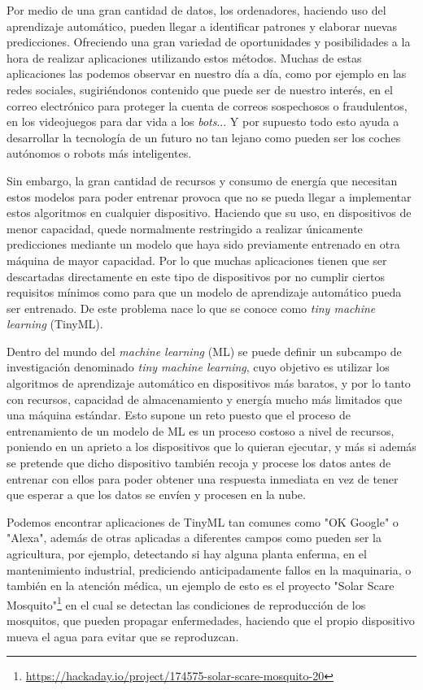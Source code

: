 \documentclass[a4paper, 12pt]{book}
\begin{document}
Por medio de una gran cantidad de datos, los ordenadores, haciendo uso del aprendizaje automático, pueden llegar a identificar patrones y elaborar nuevas predicciones. Ofreciendo una gran variedad de oportunidades y posibilidades a la hora de realizar aplicaciones utilizando estos métodos. Muchas de estas aplicaciones las podemos observar en nuestro día a día, como por ejemplo en las redes sociales, sugiriéndonos contenido que puede ser de nuestro interés, en el correo electrónico para proteger la cuenta de correos sospechosos o fraudulentos, en los videojuegos para dar vida a los \textit{bots}... Y por supuesto todo esto ayuda a desarrollar la tecnología de un futuro no tan lejano como pueden ser los coches autónomos o robots más inteligentes.

Sin embargo, la gran cantidad de recursos y consumo de energía que necesitan estos modelos para poder entrenar provoca que no se pueda llegar a implementar estos algoritmos en cualquier dispositivo. Haciendo que su uso, en dispositivos de menor capacidad, quede normalmente restringido a realizar únicamente predicciones mediante un modelo que haya sido previamente entrenado en otra máquina de mayor capacidad. Por lo que muchas aplicaciones tienen que ser descartadas directamente en este tipo de dispositivos por no cumplir ciertos requisitos mínimos como para que un modelo de aprendizaje automático pueda ser entrenado. De este problema nace lo que se conoce como \textit{tiny machine learning} (TinyML)\cite{Warden2020,TinyML}.

Dentro del mundo del \textit{machine learning} (ML) se puede definir un subcampo de investigación denominado \textit{tiny machine learning}, cuyo objetivo es utilizar los algoritmos de aprendizaje automático en dispositivos más baratos, y por lo tanto con recursos, capacidad de almacenamiento y energía mucho más limitados que una máquina estándar. Esto supone un reto puesto que el proceso de entrenamiento de un modelo de ML es un proceso costoso a nivel de recursos, poniendo en un aprieto a los dispositivos que lo quieran ejecutar, y más si además se pretende que dicho dispositivo también recoja y procese los datos antes de entrenar con ellos para poder obtener una respuesta inmediata en vez de tener que esperar a que los datos se envíen y procesen en la nube.

Podemos encontrar aplicaciones de TinyML tan comunes como "OK Google" o "Alexa", además de otras aplicadas a diferentes campos como pueden ser la agricultura, por ejemplo, detectando si hay alguna planta enferma, en el mantenimiento industrial, prediciendo anticipadamente fallos en la maquinaria, o también en la atención médica, un ejemplo de esto es el proyecto "Solar Scare Mosquito"\footnote{\url{https://hackaday.io/project/174575-solar-scare-mosquito-20}} en el cual se detectan las condiciones de reproducción de los mosquitos, que pueden propagar enfermedades, haciendo que el propio dispositivo mueva el agua para evitar que se reproduzcan.
\end{document}

